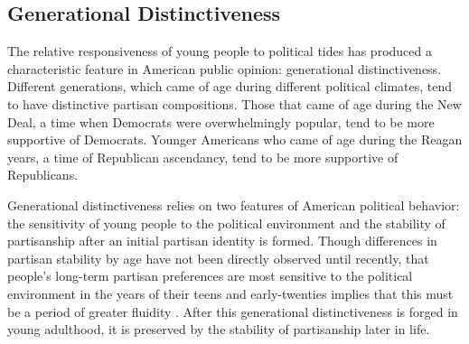 \documentclass[11pt]{scrartcl}\usepackage[]{graphicx}\usepackage[]{color}
\begin{document}
% 





\FloatBarrier
\subsection*{Generational Distinctiveness}


The relative responsiveness of young people to political tides has produced a characteristic feature in American public opinion: generational distinctiveness.  Different generations, which came of age during different political climates, tend to have distinctive partisan compositions. Those that came of age during the New Deal, a time when Democrats were overwhelmingly popular, tend to be more supportive of Democrats.  Younger Americans who came of age during the Reagan years, a time of Republican ascendancy, tend to be more supportive of Republicans.

Generational distinctiveness relies on two features of American political behavior: the sensitivity of young people to the political environment and the stability of partisanship after an initial partisan identity is formed.  Though  differences in partisan stability by age have not been directly observed until recently, that people's long-term partisan preferences are most sensitive to the political environment in the years of their teens and early-twenties implies that this must be a period of greater fluidity \citep{ghitza2014great}. After this generational distinctiveness is forged in young adulthood, it is preserved by the stability of partisanship later in life. 
\end{document}
